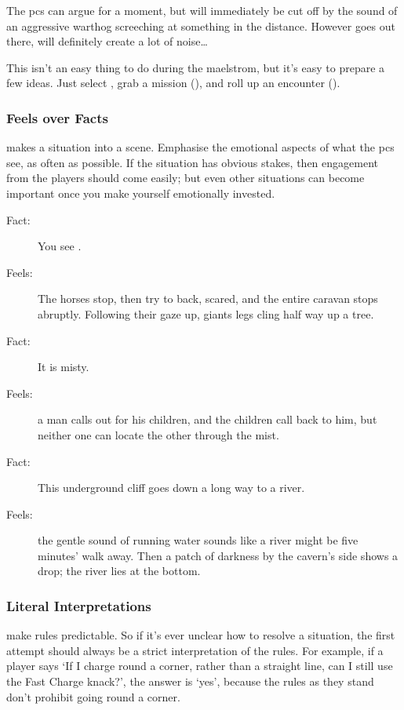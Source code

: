 \begin{multicols}{2}
The \glspl{pc} can argue for a moment, but will immediately be cut off by the sound of an aggressive warthog screeching at something in the distance.
However goes out there, will definitely create a lot of noise\ldots

\bigLine

This isn't an easy thing to do during the maelstrom, but it's easy to prepare a few ideas.
Just select , grab a mission (), and roll up an encounter ().

\subsubsection{Feels over Facts}
makes a situation into a scene.
Emphasise the emotional aspects of what the \glspl{pc} see, as often as possible.
If the situation has obvious stakes, then engagement from the players should come easily; but even other situations can become important once you make yourself emotionally invested.

\begin{description}
  \item[Fact:] You see .
  \item[\quad Feels:] The horses stop, then try to back, scared, and the entire caravan stops abruptly.
  Following their gaze up, giants legs cling half way up a tree.
  \item[Fact:] It is misty.
  \item[\quad Feels:] a man calls out for his children, and the children call back to him, but neither one can locate the other through the mist.
  \item[Fact:] This underground cliff goes down a long way to a river.
  \item[\quad Feels:] the gentle sound of running water sounds like a river might be five minutes' walk away.
  Then a patch of darkness by the cavern's side shows a drop; the river lies at the bottom.
\end{description}

\subsubsection{Literal Interpretations}
make rules predictable.
So if it's ever unclear how to resolve a situation, the first attempt should always be a strict interpretation of the rules.
For example, if a player says `If I charge round a corner, rather than a straight line, can I still use the Fast Charge knack?', the answer is `yes', because the rules as they stand don't prohibit going round a corner.


\end{multicols}
